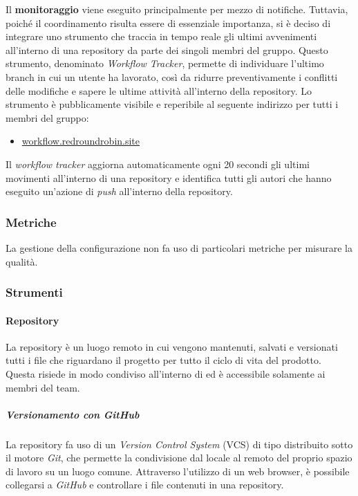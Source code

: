 	Il \textbf{monitoraggio} viene eseguito principalmente per mezzo di notifiche. Tuttavia, poiché il coordinamento risulta essere di essenziale importanza, si è deciso di integrare uno strumento che traccia in tempo reale gli ultimi avvenimenti all'interno di una repository da parte dei singoli membri del gruppo.
	Questo strumento, denominato \textit{Workflow Tracker}, permette di individuare l'ultimo branch in cui un utente ha lavorato, così da ridurre preventivamente i conflitti delle modifiche e sapere le ultime attività all'interno della repository.
	\newline
	Lo strumento è pubblicamente visibile e reperibile al seguente indirizzo per tutti i membri del gruppo:
	\begin{itemize}
		\item \href{https://workflow.redroundrobin.site}{workflow.redroundrobin.site}
	\end{itemize}
	Il \textit{workflow tracker} aggiorna automaticamente ogni 20 secondi gli ultimi movimenti all'interno di una repository e identifica tutti gli autori che hanno eseguito un'azione di \textit{push} all'interno della repository.



\subsubsection{Metriche}

La gestione della configurazione non fa uso di particolari metriche per misurare la qualità.


\subsubsection{Strumenti}

	\paragraph{Repository}
	

	La repository è un luogo remoto in cui vengono mantenuti, salvati e versionati tutti i file che riguardano il progetto per tutto il ciclo di vita del prodotto. Questa risiede in modo condiviso all'interno di  ed è accessibile solamente ai membri del team.

		\subparagraph{Versionamento con GitHub}

		La repository fa uso di un \textit{Version Control System} (VCS) di tipo distribuito sotto il motore \textit{Git}, che permette la condivisione dal locale al remoto del proprio spazio di lavoro su un luogo comune. Attraverso l'utilizzo di un web browser, è possibile collegarsi a \textit{GitHub} e controllare i file contenuti in una repository. 

